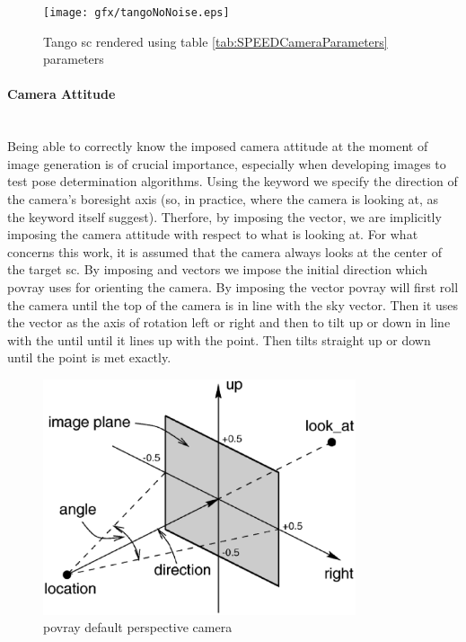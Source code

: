 \begin{figure}[htbp]
  \centering
  \texttt{[image: gfx/tangoNoNoise.eps]}
  \caption{Tango \acrshort{sc} rendered using table \ref{tab:SPEEDCameraParameters} parameters}
  \label{fig:tangoNoNoise}
\end{figure}

\paragraph{Camera Attitude}\mbox{}\\
Being able to correctly know the imposed camera attitude at the moment of image generation is of crucial importance, especially when developing images to test pose determination algorithms.
Using the  keyword we specify the direction of the camera's boresight axis (so, in practice, where the camera is looking at, as the keyword itself suggest). Therfore, by imposing the  vector, we are implicitly imposing the camera attitude with respect to what is looking at. For what concerns this work, it is assumed that the camera always looks at the center of the target \acrshort{sc}.
By imposing  and  vectors we impose the initial direction which \acrshort{povray} uses for orienting the camera.
By imposing the  vector \acrshort{povray} will first roll the camera until the top of the camera is in line with the sky vector. Then it uses the  vector as the axis of rotation left or right and then to tilt up or down in line with the  until until it lines up with the  point. Then tilts straight up or down until the  point is met exactly.

\begin{figure}[htbp]
  \centering
  \includegraphics[width=0.82\textwidth]{gfx/perspcam.eps}
  \caption{\acrshort{povray} default perspective camera}
  \label{fig:perspcam}
\end{figure}

